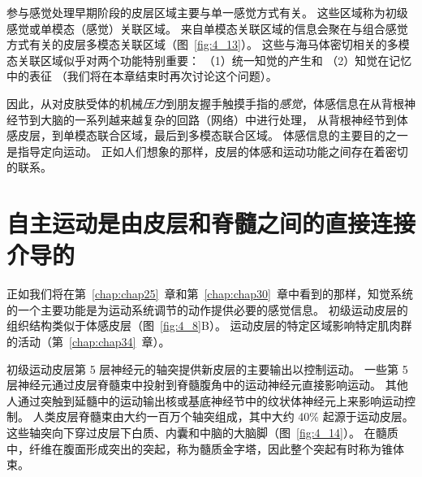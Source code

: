 参与感觉处理早期阶段的皮层区域主要与单一感觉方式有关。
这些区域称为初级感觉或单模态（感觉）关联区域。
来自单模态关联区域的信息会聚在与组合感觉方式有关的皮层多模态关联区域（图~\ref{fig:4_13}）。
这些与海马体密切相关的多模态关联区域似乎对两个功能特别重要：
（1）统一知觉的产生和 
（2）知觉在记忆中的表征
（我们将在本章结束时再次讨论这个问题）。


因此，从对皮肤受体的机械\textit{压力}到朋友握手触摸手指的\textit{感觉}，体感信息在从背根神经节到大脑的一系列越来越复杂的回路（网络）中进行处理，
从背根神经节到体感皮层，到单模态联合区域，最后到多模态联合区域。
体感信息的主要目的之一是指导定向运动。
正如人们想象的那样，皮层的体感和运动功能之间存在着密切的联系。



\section{自主运动是由皮层和脊髓之间的直接连接介导的}

正如我们将在第~\ref{chap:chap25}~章和第~\ref{chap:chap30}~章中看到的那样，知觉系统的一个主要功能是为运动系统调节的动作提供必要的感觉信息。 
初级运动皮层的组织结构类似于体感皮层（图~\ref{fig:4_8}B）。 
运动皮层的特定区域影响特定肌肉群的活动（第~\ref{chap:chap34}~章）。


初级运动皮层第 5 层神经元的轴突提供新皮层的主要输出以控制运动。
一些第 5 层神经元通过皮层脊髓束中投射到脊髓腹角中的运动神经元直接影响运动。
其他人通过突触到延髓中的运动输出核或基底神经节中的纹状体神经元上来影响运动控制。
人类皮层脊髓束由大约一百万个轴突组成，其中大约 40\% 起源于运动皮层。
这些轴突向下穿过皮层下白质、内囊和中脑的大脑脚（图~\ref{fig:4_14}）。
在髓质中，纤维在腹面形成突出的突起，称为髓质金字塔，因此整个突起有时称为锥体束。


